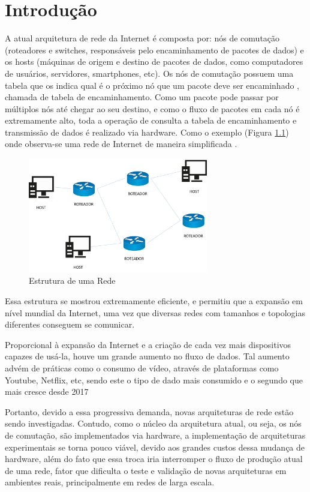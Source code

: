 
\chapter{Introdução}
 
A atual arquitetura de rede da Internet é composta por: nós de comutação (roteadores e switches, responsáveis pelo encaminhamento de pacotes de dados) e os hosts (máquinas de origem e destino de pacotes de dados, como computadores de usuários, servidores, smartphones, etc). Os nós de comutação possuem uma tabela que os indica qual é o próximo nó que um pacote deve ser encaminhado , chamada de tabela de encaminhamento. Como um pacote pode passar por múltiplos nós até chegar ao seu destino, e como o fluxo de pacotes em cada nó é extremamente alto, toda a operação de consulta a tabela de encaminhamento e transmissão de dados é realizado via hardware. Como o exemplo (Figura \ref{Fig_Rede}) onde observa-se uma rede de Internet de maneira simplificada .

\begin{figure}[h]
\centering
\includegraphics[width=0.7\textwidth]{Introducao/Rede.png}
\caption{Estrutura de uma Rede}
\label{Fig_Rede}
\end{figure}

Essa estrutura se mostrou extremamente eficiente, e permitiu que a expansão em nível mundial da Internet, uma vez que diversas redes com tamanhos e topologias diferentes conseguem se comunicar. 

Proporcional à expansão da Internet e a criação de cada vez mais dispositivos capazes de usá-la, houve um grande aumento no fluxo de dados. Tal aumento advém de práticas como o consumo de vídeo, através de plataformas como Youtube, Netflix, etc, sendo este o tipo de dado mais consumido e o segundo que mais cresce desde 2017\cite{CISCO}

Portanto, devido a essa progressiva demanda, novas arquiteturas de rede estão sendo investigadas. Contudo, como o núcleo da arquitetura atual, ou seja, os nós de comutação, são implementados via hardware, a implementação de arquiteturas experimentais se torna pouco viável, devido aos grandes custos dessa mudança de hardware, além do fato que essa troca iria interromper o fluxo de produção atual de uma rede, fator que dificulta o teste e validação de novas arquiteturas em ambientes reais, principalmente em redes de larga escala.

